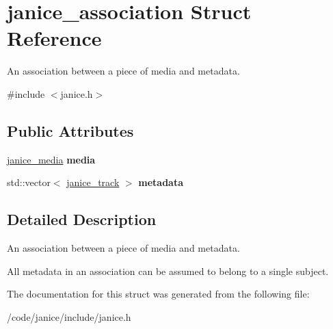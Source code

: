 \hypertarget{structjanice__association}{}\section{janice\+\_\+association Struct Reference}
\label{structjanice__association}


An association between a piece of media and metadata.  




{\ttfamily \#include $<$janice.\+h$>$}

\subsection*{Public Attributes}
\begin{DoxyCompactItemize}
\item 
\hypertarget{structjanice__association_a8dd3b4abe5242f5829120650f5435fce}{}\hyperlink{structjanice__media}{janice\+\_\+media} {\bfseries media}\label{structjanice__association_a8dd3b4abe5242f5829120650f5435fce}

\item 
\hypertarget{structjanice__association_a6fa252249ab332685b05d1de9610be6b}{}std\+::vector$<$ \hyperlink{structjanice__track}{janice\+\_\+track} $>$ {\bfseries metadata}\label{structjanice__association_a6fa252249ab332685b05d1de9610be6b}

\end{DoxyCompactItemize}


\subsection{Detailed Description}
An association between a piece of media and metadata. 

All metadata in an association can be assumed to belong to a single subject. 

The documentation for this struct was generated from the following file\+:\begin{DoxyCompactItemize}
\item 
/code/janice/include/janice.\+h\end{DoxyCompactItemize}
